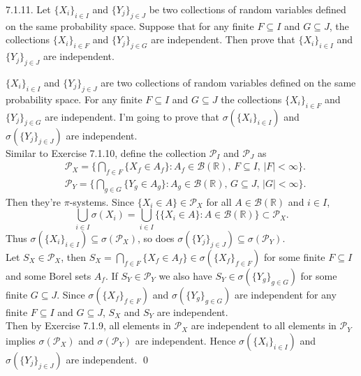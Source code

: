 \begin{exercise} 7.1.11. 
Let $\{X_i\}_{i\in I}$ and $\{Y_j\}_{j\in J}$ be two collections of random variables defined on the same probability space. Suppose that for any finite $F\subseteq I$ and $G\subseteq J$, the collections $\{X_i\}_{i\in F}$ and $\{Y_j\}_{j\in G}$ are independent. Then prove that $\{X_i\}_{i\in I}$ and $\{Y_j\}_{j\in J}$ are independent.
\end{exercise}
\begin{answer}
    $\{X_i\}_{i\in I}$ and $\{Y_j\}_{j\in J}$ are two collections of random variables defined on the same probability space. For any finite $F\subseteq I$ and $G\subseteq J$ the collections $\{X_i\}_{i\in F}$ and $\{Y_j\}_{j\in G}$ are independent. I'm going to prove that $\sigma(\{X_i\}_{i\in I})$ and $\sigma(\{Y_j\}_{j\in J})$ are independent.\\
    Similar to Exercise 7.1.10, define the collection $\mathcal{P}_I$ and $\mathcal{P}_J$ as
    \begin{equation*}
        \begin{aligned}
                    &\mathcal{P}_X=\Big\{\bigcap_{f\in F}\{X_{f}\in A_f\}:A_f\in\mathcal{B}(\mathbb{R}),\,F\subseteq I\Big,\,|F|<\infty\Big\}.\\
                    &\mathcal{P}_Y=\Big\{\bigcap_{g\in G}\{Y_{g}\in A_g\}:A_g\in\mathcal{B}(\mathbb{R}),\,G\subseteq J,\,|G|<\infty\Big\}.
        \end{aligned}
    \end{equation*}
    Then they're $\pi$-systems. Since $\{X_i\in A\}\in\mathcal{P}_X$ for all $A\in\mathcal{B}(\mathbb{R})$ and $i\in I$,
    \begin{equation*}
                \bigcup_{i\in I}\sigma(X_i)=\bigcup_{i\in I}\Big\{\{X_i\in A\}:A\in\mathcal{B}(\mathbb{R})\Big\}\subset\mathcal{P}_X.
    \end{equation*}
    Thus $\sigma(\{X_i\}_{i\in I})\subseteq\sigma(\mathcal{P}_X)$, so does $\sigma(\{Y_j\}_{j\in J})\subseteq\sigma(\mathcal{P}_Y)$.\\
    Let $S_X\in\mathcal{P}_X$, then $S_X=\bigcap_{f\in F}\{X_f\in A_f\}\in\sigma(\{X_f\}_{f\in F})$ for some finite $F\subseteq I$ and some Borel sets $A_f$. If $S_Y\in\mathcal{P}_Y$ we also have $S_Y\in\sigma(\{Y_g\}_{g\in G})$ for some finite $G\subseteq J$. Since $\sigma(\{X_f\}_{f\in F})$ and $\sigma(\{Y_g\}_{g\in G})$ are independent for any finite $F\subseteq I$ and $G\subseteq J$, $S_X$ and $S_Y$ are independent.\\
    Then by Exercise 7.1.9, all elements in $\mathcal{P}_X$ are independent to all elements in $\mathcal{P}_Y$ implies $\sigma(\mathcal{P}_X)$ and $\sigma(\mathcal{P}_Y)$ are independent. Hence $\sigma(\{X_i\}_{i\in I})$ and $\sigma(\{Y_j\}_{j\in J})$ are independent. \qquad \qed
\end{answer}


